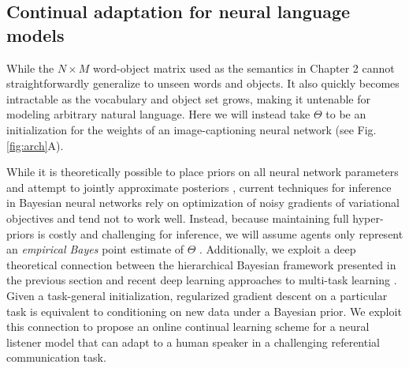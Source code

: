 \subsection{Continual adaptation for neural language models}


While the $N \times M$ word-object matrix used as the semantics in Chapter 2 cannot straightforwardly generalize to unseen words and objects. 
It also quickly becomes intractable as the vocabulary and object set grows, making it untenable for modeling arbitrary natural language.
Here we will instead take $\Theta$ to be an initialization for the weights of an image-captioning neural network (see Fig. \ref{fig:arch}A).

While it is theoretically possible to place priors on all neural network parameters and attempt to jointly approximate posteriors , current techniques for inference in Bayesian neural networks rely on optimization of noisy gradients of variational objectives and tend not to work well. 
Instead, because maintaining full hyper-priors is costly and challenging for inference, we will assume agents only represent an \emph{empirical Bayes} point estimate of $\Theta$ \cite{gelman_bayesian_2014}.
Additionally, we exploit a deep theoretical connection between the hierarchical Bayesian framework presented in the previous section and recent deep learning approaches to multi-task learning \cite{nagabandi_deep_2018,grant_recasting_2018,jerfel_online_2018}. 
Given a task-general initialization, regularized gradient descent on a particular task is equivalent to conditioning on new data under a Bayesian prior.
We exploit this connection to propose an online continual learning scheme for a neural listener model that can adapt to a human speaker in a challenging referential communication task.

